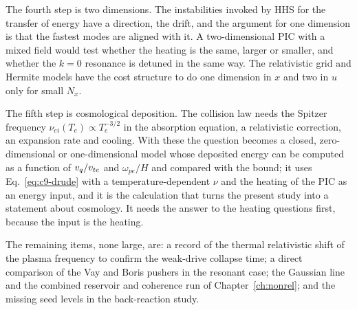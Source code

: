 The fourth step is two dimensions. The instabilities invoked by HHS for the transfer of energy have a direction, the drift, and the argument for one dimension is that the fastest modes are aligned with it. A two-dimensional PIC with a mixed field would test whether the heating is the same, larger or smaller, and whether the $k=0$ resonance is detuned in the same way. The relativistic grid and Hermite models have the cost structure to do one dimension in $x$ and two in $u$ only for small $N_x$.

The fifth step is cosmological deposition. The collision law needs the Spitzer frequency $\nu_{ei}(T_e)\propto T_e^{-3/2}$ in the absorption equation, a relativistic correction, an expansion rate and cooling. With these the question becomes a closed, zero-dimensional or one-dimensional model whose deposited energy can be computed as a function of $v_q/v_{te}$ and $\omega_{pe}/H$ and compared with the bound; it uses Eq.~\eqref{eq:c9-drude} with a temperature-dependent $\nu$ and the heating of the PIC as an energy input, and it is the calculation that turns the present study into a statement about cosmology. It needs the answer to the heating questions first, because the input is the heating.

The remaining items, none large, are: a record of the thermal relativistic shift of the plasma frequency to confirm the weak-drive collapse time; a direct comparison of the Vay and Boris pushers in the resonant case; the Gaussian line and the combined reservoir and coherence run of Chapter~\ref{ch:nonrel}; and the missing seed levels in the back-reaction study.
